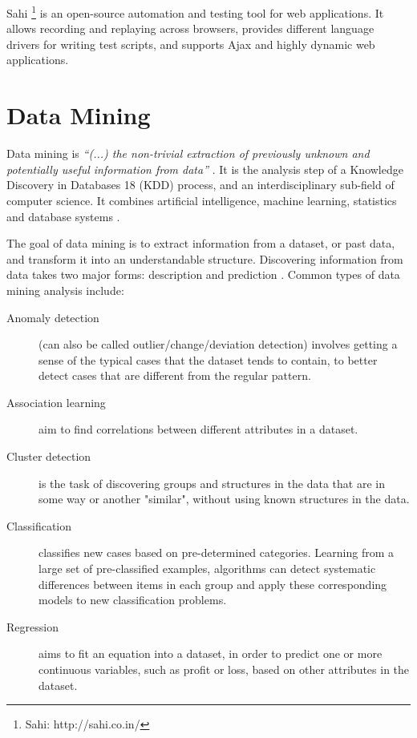 Sahi \footnote{Sahi: http://sahi.co.in/} is an open-source automation and testing tool for web applications. It allows recording and replaying across browsers, provides different language drivers for writing test scripts, and supports Ajax and highly dynamic web applications. 

\section{Data Mining}\label{sec:datamining}

Data mining is \textit{“(...) the non-trivial extraction of previously unknown and potentially useful information from data”} \cite{fayyad1996data}. It is the analysis step of a Knowledge Discovery in Databases 18 (KDD) process, and an interdisciplinary sub-field of computer science. It combines artificial intelligence, machine learning, statistics and database systems \cite{chakrabarti2004data}.

The goal of data mining is to extract information from a dataset, or past data, and transform it into an understandable structure. Discovering information from data takes two major forms: description and prediction \cite{maimon2005data}. Common types of data mining analysis include:
\begin{description}
	\item[Anomaly detection] (can also be called outlier/change/deviation detection) involves getting a sense of the typical cases that the dataset tends to contain, to better detect cases that are different from the regular pattern.
	\item[Association learning] aim to find correlations between different attributes in a dataset.
	\item[Cluster detection] is the task of discovering groups and structures in the data that are in some way or another "similar", without using known structures in the data.
	\item[Classification] classifies new cases based on pre-determined categories. Learning from a large set of pre-classified examples, algorithms can detect systematic differences between items in each group and apply these corresponding models to new classification problems.
	\item[Regression] aims to fit an equation into a dataset, in order to predict one or more continuous variables, such as profit or loss, based on other attributes in the dataset.
\end{description}

